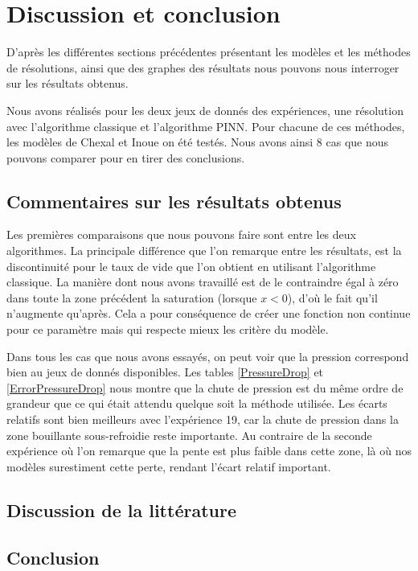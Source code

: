 \section{Discussion et conclusion}
D'après les différentes sections précédentes présentant les modèles et les méthodes de résolutions, ainsi que des graphes des résultats nous pouvons nous interroger sur les résultats obtenus.\\ \par
Nous avons réalisés pour les deux jeux de donnés des expériences, une résolution avec l'algorithme classique et l'algorithme PINN. Pour chacune de ces méthodes, les modèles de Chexal et Inoue on été testés. Nous avons ainsi 8 cas que nous pouvons comparer pour en tirer des conclusions.
\subsection{Commentaires sur les résultats obtenus}


Les premières comparaisons que nous pouvons faire sont entre les deux algorithmes. La principale différence que l'on remarque entre les résultats, est la discontinuité pour le taux de vide que l'on obtient en utilisant l'algorithme classique. La manière dont nous avons travaillé est de le contraindre égal à zéro dans toute la zone précédent la saturation (lorsque $x<0$), d'où le fait qu'il n'augmente qu'après. Cela a pour conséquence de créer une fonction non continue pour ce paramètre mais qui respecte mieux les critère du modèle.\\ \par
Dans tous les cas que nous avons essayés, on peut voir que la pression correspond bien au jeux de donnés disponibles. 
Les tables \ref{PressureDrop} et \ref{ErrorPressureDrop} nous montre que la chute de pression est du même ordre de grandeur que ce qui était attendu quelque soit la méthode utilisée. Les écarts relatifs sont bien meilleurs avec l'expérience 19, car la chute de pression dans la zone bouillante sous-refroidie reste importante. Au contraire de la seconde expérience où l'on remarque que la pente est plus faible dans cette zone, là où nos modèles surestiment cette perte, rendant l'écart relatif important.  

\subsection{Discussion  de la littérature}

\subsection{Conclusion}

